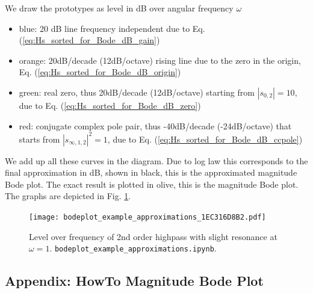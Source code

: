 \documentclass[11pt,a4paper,DIV=12]{scrartcl}
\numberwithin{equation}{section}
\numberwithin{figure}{section}
\newcommand{\eq}[1]{Eq. (\ref{#1})} %
\newcommand{\fig}[1]{Fig. \ref{#1}} %
\begin{document}
\begin{Loesung}
We draw the prototypes as level in dB over angular frequency $\omega$
\begin{itemize}
\item blue: 20 dB line frequency independent due to \eq{eq:Hs_sorted_for_Bode_dB_gain}
\item orange: 20dB/decade (12dB/octave) rising line due to the zero in the origin,
\eq{eq:Hs_sorted_for_Bode_dB_origin}
\item green: real zero, thus 20dB/decade (12dB/octave) starting from $|s_{0,2}| = 10$, due to
\eq{eq:Hs_sorted_for_Bode_dB_zero}
\item red: conjugate complex pole pair, thus -40dB/decade (-24dB/octave) that starts from
$|s_{\infty,1,2}|^2 = 1$, due to \eq{eq:Hs_sorted_for_Bode_dB_ccpole}
\end{itemize}
We add up all these curves in the diagram. Due to log law this corresponds to the final approximation
in dB, shown in black, this is the approximated magnitude Bode plot.
The exact result is plotted in olive, this is the magnitude Bode plot.
The graphs are depicted in \fig{fig:bodeplot_example_approximations_1EC316D8B2}.
\end{Loesung}

\begin{figure}[h!]
\centering
\texttt{[image: bodeplot\_example\_approximations\_1EC316D8B2.pdf]}
\caption{Level over frequency of 2nd order highpass with slight resonance
at $\omega=1$. \texttt{bodeplot\_example\_approximations.ipynb}.}
\label{fig:bodeplot_example_approximations_1EC316D8B2}
\end{figure}



















\clearpage
\subsection{Appendix: HowTo Magnitude Bode Plot}
\end{document}

